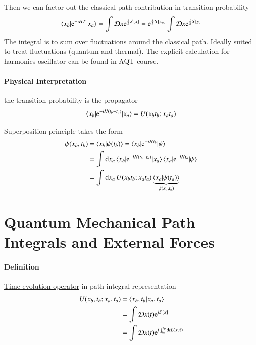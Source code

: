 Then we can factor out the classical path contribution in transition probability
\begin{align*}
   \braket{ x_b | \mathrm{e}^{-iHT} | x_a } = \int \mathcal{D}x \mathrm{e}^{\frac{i}{\hbar} S[x]} =  \mathrm{e}^{\frac{i}{\hbar} S[x_a]} \int \mathcal{D}x \mathrm{e}^{\frac{i}{\hbar} S[y]}
\end{align*}
The integral is to sum over fluctuations around the classical path. Ideally suited to treat fluctuations (quantum and thermal). The explicit calculation for harmonics oscillator can be found in AQT course.

\paragraph{Physical Interpretation} the transition probability is the propagator
\begin{align}
   \braket{x_b | \mathrm{e}^{-iH(t_b - t_a)} | x_a} = U (x_b t_b; x_a t_a)
\end{align}

Superposition principle takes the form
\begin{align*}
   \psi(x_b, t_b) &= \braket{x_b | \psi(t_b) } = \braket{x_b | \mathrm{e}^{-iHt_b} | \psi} \\
                  &= \int \dd{x_a} \braket{x_b | \mathrm{e}^{-iH(t_b - t_a)}| x_a } \braket{x_a| \mathrm{e}^{-iHt_a} | \psi} \\
                  &= \int \dd{x_a} U(x_b t_b; x_a t_a) \underbrace{\braket{x_a | \psi(t_a)}}_{\psi(x_a, t_a)} \\
\end{align*}

\section{Quantum Mechanical Path Integrals and External Forces}
\paragraph{Definition} \underline{Time evolution operator} in path integral representation
\begin{align}
   U(x_b, t_b; x_a, t_a) &= \braket{x_b, t_b | x_a, t_a}\\
                       &= \int \mathcal{D} x(t) \mathrm{e}^{iS[x]} \notag \\
                       &= \int \mathcal{D} x(t) \mathrm{e}^{i\int^{t_b}_{t_a} \dd{t} L(x, \dot{x})} \notag
\end{align}

